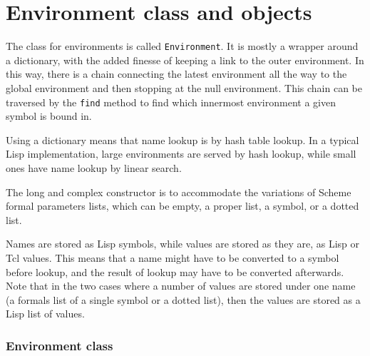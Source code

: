 \documentclass[twoside]{report}
\begin{document}
\chapter{Environment class and objects}
\label{environment-class-and-objects}

The class for environments is called \texttt{Environment}. It is mostly a wrapper around a dictionary, with the added finesse of keeping a link to the outer environment. In this way, there is a chain connecting the latest environment all the way to the global environment and then stopping at the null environment. This chain can be traversed by the \texttt{find} method to find which innermost environment a given symbol is bound in.

Using a dictionary means that name lookup is by hash table lookup. In a typical Lisp implementation, large environments are served by hash lookup, while small ones have name lookup by linear search.

The long and complex constructor is to accommodate the variations of Scheme formal parameters lists, which can be empty, a proper list, a symbol, or a dotted list.

Names are stored as Lisp symbols, while values are stored as they are, as Lisp or Tcl values. This means that a name might have to be converted to a symbol before lookup, and the result of lookup may have to be converted afterwards. Note that in the two cases where a number of values are stored under one name (a formals list of a single symbol or a dotted list), then the values are stored as a Lisp list of values.

\subsection{Environment class}
\label{environment-class}
\end{document}
